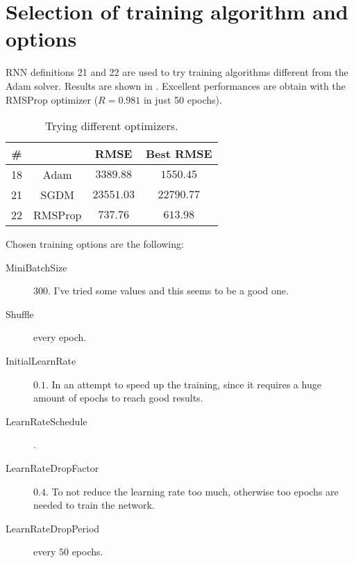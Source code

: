 \section{Selection of training algorithm and options}\label{sec:rnntraining}

RNN definitions 21 and 22 are used to try training algorithms different from
the Adam solver. Results are shown in . Excellent
performances are obtain with the RMSProp optimizer (\(R = 0.981\) in just 50
epochs).

\begin{table}[hbtp]
	\centering
	\begin{tabular}{|c|c|c|c|}
		\toprule
		\# &  & RMSE & Best RMSE \\
		\midrule
		18 & Adam & \(3389.88\) & \(1550.45\) \\
		21 & SGDM & \(23551.03\) & \(22790.77\) \\
		22 & RMSProp & \(737.76\) & \(613.98\) \\
		\bottomrule
	\end{tabular}
	\caption{Trying different optimizers.}\label{table:rnntraining}
\end{table}

Chosen training options are the following:
\begin{description}
	\item[MiniBatchSize] \(300\). I've tried some values and this seems to
		be a good one.
	\item[Shuffle] every epoch.
	\item[InitialLearnRate] \(0.1\). In an attempt to speed up the
		training, since it requires a huge amount of epochs to reach
		good results.
	\item[LearnRateSchedule] .
	\item[LearnRateDropFactor] \(0.4\). To not reduce the learning rate too
		much, otherwise too epochs are needed to train the network.
	\item[LearnRateDropPeriod] every \(50\) epochs.
\end{description}
